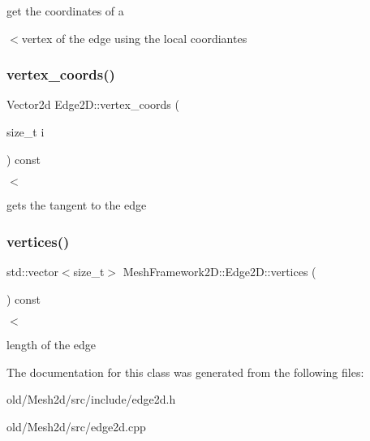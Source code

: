get the coordinates of a 

$<$vertex of the edge using the local coordiantes \mbox{\label{classMeshFramework2D_1_1Edge2D_a8b6328521251ebaa45f217834d675c48}} 
\subsubsection{\texorpdfstring{vertex\+\_\+coords()}{vertex\_coords()}}
{\footnotesize\ttfamily Vector2d Edge2\+D\+::vertex\+\_\+coords (\begin{DoxyParamCaption}\item[{size\+\_\+t}]{i }\end{DoxyParamCaption}) const}



$<$ 

gets the tangent to the edge \mbox{\label{classMeshFramework2D_1_1Edge2D_a7343e846b9a43d408d8874b8322736fc}} 
\subsubsection{\texorpdfstring{vertices()}{vertices()}}
{\footnotesize\ttfamily std\+::vector$<$size\+\_\+t$>$ Mesh\+Framework2\+D\+::\+Edge2\+D\+::vertices (\begin{DoxyParamCaption}{ }\end{DoxyParamCaption}) const}



$<$ 

length of the edge 

The documentation for this class was generated from the following files\+:\begin{DoxyCompactItemize}
\item 
old/\+Mesh2d/src/include/edge2d.\+h\item 
old/\+Mesh2d/src/edge2d.\+cpp\end{DoxyCompactItemize}
